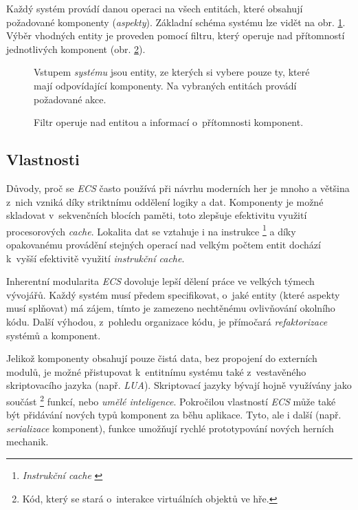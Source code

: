Každý systém provádí danou operaci na všech entitách, které obsahují požadované komponenty (\emph{aspekty}). Základní schéma systému lze vidět na obr. \ref{Fig:ECSSystem}. Výběr vhodných entity je proveden pomocí filtru, který operuje nad přítomností jednotlivých komponent (obr. \ref{Fig:ECSFilter}).

\begin{figure}[H]
	\caption{Vstupem \emph{systému} jsou entity, ze kterých si vybere pouze ty, které mají odpovídající komponenty. Na vybraných entitách provádí požadované akce.}
	\label{Fig:ECSSystem}
\end{figure}
\begin{figure}[H]
	\caption{Filtr operuje nad entitou a informací o~přítomnosti komponent.}
	\label{Fig:ECSFilter}
\end{figure}

\subsection{Vlastnosti}

Důvody, proč se \emph{ECS} často používá při návrhu moderních her je mnoho a většina z~nich vzniká díky striktnímu oddělení logiky a dat. Komponenty je možné skladovat v~sekvenčních blocích paměti, toto zlepšuje efektivitu využití procesorových \emph{cache}. Lokalita dat se vztahuje i na instrukce \cite{InstrAreData} \footnote{\emph{Instrukční cache} \cite{CpuMemoryGap}} a díky opakovanému provádění stejných operací nad velkým počtem entit dochází k~vyšší efektivitě využití \emph{instrukční cache}. 

Inherentní modularita \emph{ECS} dovoluje lepší dělení práce ve velkých týmech vývojářů. Každý systém musí předem specifikovat, o~jaké entity (které aspekty musí splňovat) má zájem, tímto je zamezeno nechtěnému ovlivňování okolního kódu. Další výhodou, z~pohledu organizace kódu, je přímočará \emph{refaktorizace} systémů a komponent.

Jelikož komponenty obsahují pouze čistá data, bez propojení do externích modulů, je možné přistupovat k~entitnímu systému také z~vestavěného skriptovacího jazyka (např. \emph{LUA}). Skriptovací jazyky bývají hojně využívány jako součást  \footnote{Kód, který se stará o~interakce virtuálních objektů ve hře.} funkcí, nebo \emph{umělé inteligence}. Pokročilou vlastností \emph{ECS} může také být přidávání nových typů komponent za běhu aplikace. Tyto, ale i další (např. \emph{serializace} komponent), funkce umožňují rychlé prototypování nových herních mechanik.

